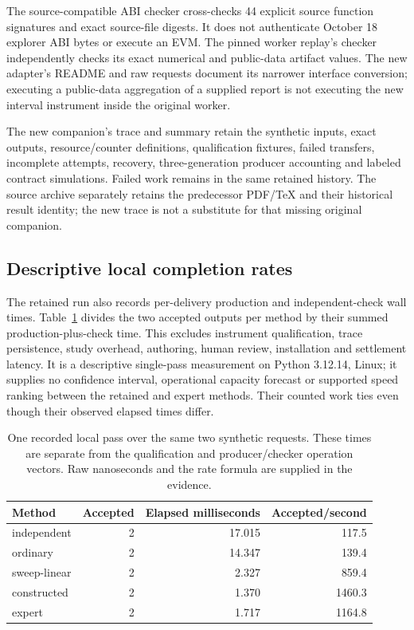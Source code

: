 \documentclass[11pt,letterpaper]{article}
\begin{document}
The source-compatible ABI checker cross-checks 44 explicit source function signatures and exact source-file digests. It does not authenticate October 18 explorer ABI bytes or execute an EVM. The pinned worker replay's checker independently checks its exact numerical and public-data artifact values. The new adapter's README and raw requests document its narrower interface conversion; executing a public-data aggregation of a supplied report is not executing the new interval instrument inside the original worker.

The new companion's trace and summary retain the synthetic inputs, exact outputs, resource/counter definitions, qualification fixtures, failed transfers, incomplete attempts, recovery, three-generation producer accounting and labeled contract simulations. Failed work remains in the same retained history. The source archive separately retains the predecessor PDF/TeX and their historical result identity; the new trace is not a substitute for that missing original companion.

\subsection{Descriptive local completion rates}
The retained run also records per-delivery production and independent-check wall times. Table~\ref{tab:local-rate} divides the two accepted outputs per method by their summed production-plus-check time. This excludes instrument qualification, trace persistence, study overhead, authoring, human review, installation and settlement latency. It is a descriptive single-pass measurement on Python 3.12.14, Linux; it supplies no confidence interval, operational capacity forecast or supported speed ranking between the retained and expert methods. Their counted work ties even though their observed elapsed times differ.
\begin{table}[htbp]\centering\small
\begin{tabular}{@{}lrrr@{}}\toprule Method & Accepted & Elapsed milliseconds & Accepted/second\\\midrule
independent & 2 & 17.015 & 117.5\\
ordinary & 2 & 14.347 & 139.4\\
sweep-linear & 2 & 2.327 & 859.4\\
constructed & 2 & 1.370 & 1460.3\\
expert & 2 & 1.717 & 1164.8\\
\bottomrule\end{tabular}
\caption{One recorded local pass over the same two synthetic requests. These times are separate from the qualification and producer/checker operation vectors. Raw nanoseconds and the rate formula are supplied in the evidence.}\label{tab:local-rate}
\end{table}
\end{document}
